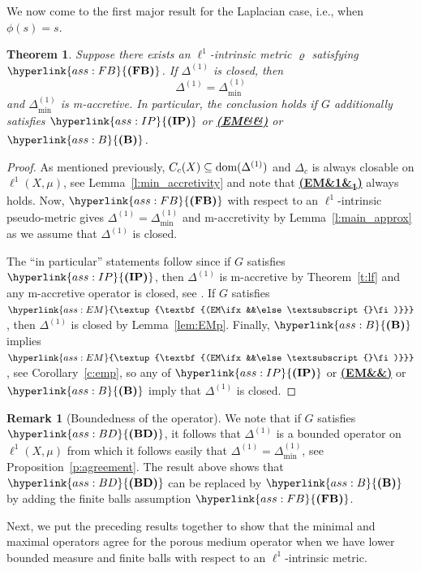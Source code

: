 \documentclass[letterpaper]{article}
\newtheorem{theorem}[lemma]{Theorem}
\theoremstyle{definition}
\newtheorem{remark}[lemma]{Remark}
\theoremstyle{named}
\numberwithin{equation}{section}
\newcommand{\IP}{\hyperlink{ass:IP}{\textup{\textbf{(IP)}}}}
\newcommand{\B}{\hyperlink{ass:B}{\textup{\textbf{(B)}}}}
\newcommand{\BD}{\hyperlink{ass:BD}{\textup{\textbf{(BD)}}}}
\newcommand{\FB}{\hyperlink{ass:FB}{\textup{\textbf{(FB)}}}}
\newcommand{\EM}[1][]{\hyperlink{ass:EM}{\textup{\textbf{(EM\ifx&#1&\else\textsubscript{#1}\fi)}}}}
\newcommand{\dom}{\textnormal{dom}} %
\newcommand{\deltam}{\Delta_{\min}}
\begin{document}
We now come to the first major result
for the Laplacian case, i.e., when $\phi(s)=s$.
\begin{theorem}\label{t:Laplacian_min_max}
Suppose there exists an $\ell^1$-intrinsic metric $\varrho$ satisfying $\FB$.
If $\Delta^{(1)}$ is closed, then
$$\Delta^{(1)}=\deltam^{(1)}$$
and
$\Delta_{\min}^{(1)}$ is m-accretive. In particular, the conclusion holds if $G$ additionally satisfies
$\IP$ or \EM[] or $\B$.
\end{theorem}
\begin{proof}
As mentioned previously, $C_c(X) \subseteq \dom(\Delta^{(1)})$
and $\Delta_c$ is always closable on $\ell^1(X,\mu)$, see Lemma~\ref{l:min_accretivity}
and note that \EM[1] always holds.
Now, $\FB$ with respect to an $\ell^1$-intrinsic pseudo-metric gives
$\Delta^{(1)} = \Delta_{\min}^{(1)}$ and m-accretivity by Lemma~\ref{l:main_approx}
as we assume that $\Delta^{(1)}$ is closed.

The ``in particular'' statements follow since
if $G$ satisfies $\IP$, then $\Delta^{(1)}$ is m-accretive by
Theorem~\ref{t:lf} and any m-accretive operator
is closed, see \cite[III.~Proposition~3.4]{barbu2010nonlinear}.
If $G$ satisfies $\EM$, then $\Delta^{(1)}$ is closed by Lemma~\ref{lem:EMp}.
Finally, $\B$ implies $\EM$, see Corollary~\ref{c:emp}, so any of
$\IP$ or \EM[] or $\B$ imply that $\Delta^{(1)}$ is closed.
\end{proof}

\begin{remark}[Boundedness of the operator]
    We note that if $G$ satisfies $\BD$, it follows that $\Delta^{(1)}$ is a bounded
    operator on $\ell^1(X,\mu)$ from which it follows easily that $\Delta^{(1)}=\deltam^{(1)}$,
    see Proposition~\ref{p:agreement}. 
    The result above shows that $\BD$ can be replaced by $\B$ 
    by adding the finite balls assumption $\FB$.
\end{remark}






Next, we put the preceding results together to 
show that the minimal and maximal operators agree for the porous
medium operator when we have lower bounded measure and finite balls
with respect to an $\ell^1$-intrinsic metric.
\end{document}
